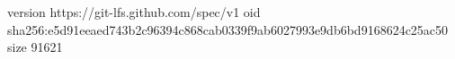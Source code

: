 version https://git-lfs.github.com/spec/v1
oid sha256:e5d91eeaed743b2c96394c868cab0339f9ab6027993e9db6bd9168624c25ac50
size 91621
